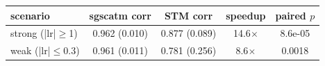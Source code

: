\begin{tabular}{lcccc}
\toprule
scenario & sgscatm corr & STM corr & speedup & paired $p$ \\
\midrule
strong (|lr|$\geq$1) & 0.962 (0.010) & 0.877 (0.089) & 14.6$\times$ & 8.6e-05 \\
weak (|lr|$\leq$0.3) & 0.961 (0.011) & 0.781 (0.256) & 8.6$\times$ & 0.0018 \\
\bottomrule
\end{tabular}
